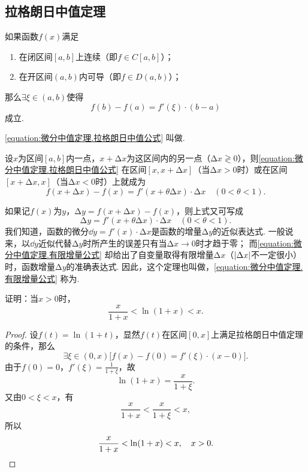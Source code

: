 \subsection{拉格朗日中值定理}
\begin{theorem}[拉格朗日中值定理]\label{theorem:微分中值定理.拉格朗日中值定理}
如果函数\(f(x)\)满足
\begin{enumerate}
\item 在闭区间\([a,b]\)上连续（即\(f \in C[a,b]\)）；
\item 在开区间\((a,b)\)内可导（即\(f \in D(a,b)\)）；
\end{enumerate}
那么\(\exists \xi \in (a,b)\)使得
\begin{equation}\label{equation:微分中值定理.拉格朗日中值公式}
f(b)-f(a)=f'(\xi) \cdot (b-a)
\end{equation}
成立.
\end{theorem}
\cref{equation:微分中值定理.拉格朗日中值公式} 叫做.

设\(x\)为区间\([a,b]\)内一点，\(x+\increment x\)为这区间内的另一点（\(\increment x \gtrless 0\)），则\cref{equation:微分中值定理.拉格朗日中值公式} 在区间\([x,x+\increment x]\)（当\(\increment x>0\)时）或在区间\([x+\increment x,x]\)（当\(\increment x<0\)时）上就成为
\begin{equation}
f(x+\increment x) - f(x)
= f'(x+\theta \increment x) \cdot \increment x
\quad(0<\theta<1).
\end{equation}

如果记\(f(x)\)为\(y\)，\(\increment y = f(x+\increment x) - f(x)\)，则上式又可写成
\begin{equation}\label{equation:微分中值定理.有限增量公式}
\increment y = f'(x+\theta \increment x) \cdot \increment x
\quad(0<\theta<1).
\end{equation}
我们知道，函数的微分\(\dd{y} = f'(x) \cdot \increment x\)是函数的增量\(\increment y\)的近似表达式.
一般说来，以\(\dd{y}\)近似代替\(\increment y\)时所产生的误差只有当\(\increment x\to0\)时才趋于零；
而\cref{equation:微分中值定理.有限增量公式} 却给出了自变量取得有限增量\(\increment x\)（\(\abs{\Delta x}\)不一定很小）时，函数增量\(\increment y\)的准确表达式.
因此，这个定理也叫做，\cref{equation:微分中值定理.有限增量公式} 称为.

\begin{example}\label{example:微分中值定理.拉格朗日中值定理.重要不等式1}
证明：当\(x>0\)时，\[
\frac{x}{1+x} < \ln(1+x) < x.
\]
\begin{proof}
设\(f(t) = \ln(1+t)\)，显然\(f(t)\)在区间\([0,x]\)上满足拉格朗日中值定理的条件，那么\[
\exists \xi\in(0,x) \bigl[
	f(x)-f(0)=f'(\xi)\cdot(x-0)
\bigr].
\]由于\(f(0)=0\)，\(f'(\xi)=\frac{1}{1+\xi}\)，故\[
\ln(1+x) = \frac{x}{1+\xi}.
\]又由\(0<\xi<x\)，有\[
\frac{x}{1+x}<\frac{x}{1+\xi}<x,
\]所以\[
\frac{x}{1+x}<\ln(1+x)<x, \quad x > 0.
\qedhere
\]
\end{proof}
\end{example}


